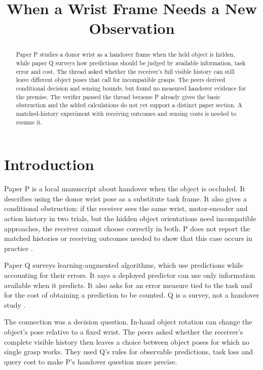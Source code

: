 \documentclass{article}
\title{When a Wrist Frame Needs a New Observation}
\begin{document}
\maketitle

\begin{abstract}
Paper P studies a donor wrist as a handover frame when the held object is hidden, while paper Q surveys
how predictions should be judged by available information, task error and cost. The thread asked whether
the receiver's full visible history can still leave different object poses that call for incompatible
grasps. The peers derived conditional decision and sensing bounds, but found no measured handover
evidence for the premise. The verifier paused the thread because P already gives the basic obstruction
and the added calculations do not yet support a distinct paper section. A matched-history experiment with
receiving outcomes and sensing costs is needed to resume it.
\end{abstract}

\section{Introduction}

Paper P is a local manuscript about handover when the object is occluded. It describes using the donor
wrist pose as a substitute task frame. It also gives a conditional obstruction: if the receiver sees the
same wrist, motor-encoder and action history in two trials, but the hidden object orientations need
incompatible approaches, the receiver cannot choose correctly in both. P does not report the matched
histories or receiving outcomes needed to show that this case occurs in practice \cite{P}.

Paper Q surveys learning-augmented algorithms, which use predictions while accounting for their errors.
It says a deployed predictor can use only information available when it predicts. It also asks for an
error measure tied to the task and for the cost of obtaining a prediction to be counted. Q is a survey,
not a handover study \cite{Q}.

The connection was a decision question. In-hand object rotation can change the object's pose relative to
a fixed wrist. The peers asked whether the receiver's complete visible history then leaves a choice
between object poses for which no single grasp works. They used Q's rules for observable predictions,
task loss and query cost to make P's handover question more precise.
\end{document}
